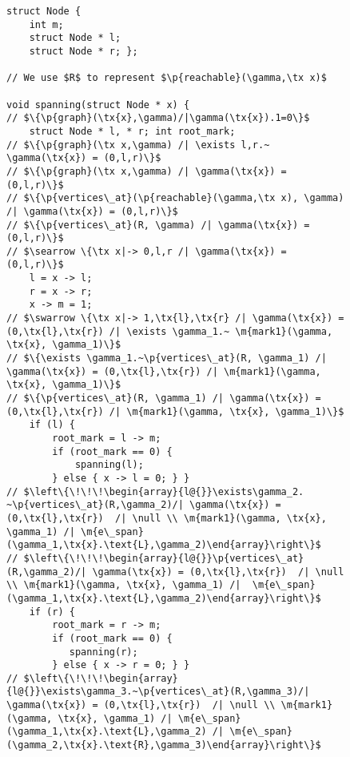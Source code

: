 \begin{figure}[t]
  \begin{lstlisting}
struct Node {
    int m;
    struct Node * l;
    struct Node * r; };

// We use $R$ to represent $\p{reachable}(\gamma,\tx x)$

void spanning(struct Node * x) { 
// $\{\p{graph}(\tx{x},\gamma)/|\gamma(\tx{x}).1=0\}$ 
    struct Node * l, * r; int root_mark;
// $\{\p{graph}(\tx x,\gamma) /| \exists l,r.~ \gamma(\tx{x}) = (0,l,r)\}$
// $\{\p{graph}(\tx x,\gamma) /| \gamma(\tx{x}) = (0,l,r)\}$
// $\{\p{vertices\_at}(\p{reachable}(\gamma,\tx x), \gamma) /| \gamma(\tx{x}) = (0,l,r)\}$
// $\{\p{vertices\_at}(R, \gamma) /| \gamma(\tx{x}) = (0,l,r)\}$
// $\searrow \{\tx x|-> 0,l,r /| \gamma(\tx{x}) = (0,l,r)\}$
    l = x -> l;
    r = x -> r;
    x -> m = 1;
// $\swarrow \{\tx x|-> 1,\tx{l},\tx{r} /| \gamma(\tx{x}) = (0,\tx{l},\tx{r}) /| \exists \gamma_1.~ \m{mark1}(\gamma, \tx{x}, \gamma_1)\}$
// $\{\exists \gamma_1.~\p{vertices\_at}(R, \gamma_1) /| \gamma(\tx{x}) = (0,\tx{l},\tx{r}) /| \m{mark1}(\gamma, \tx{x}, \gamma_1)\}$
// $\{\p{vertices\_at}(R, \gamma_1) /| \gamma(\tx{x}) = (0,\tx{l},\tx{r}) /| \m{mark1}(\gamma, \tx{x}, \gamma_1)\}$
    if (l) {
        root_mark = l -> m;
        if (root_mark == 0) {
            spanning(l);
        } else { x -> l = 0; } }
// $\left\{\!\!\!\begin{array}{l@{}}\exists\gamma_2. ~\p{vertices\_at}(R,\gamma_2)/| \gamma(\tx{x}) = (0,\tx{l},\tx{r})  /| \null \\ \m{mark1}(\gamma, \tx{x}, \gamma_1) /| \m{e\_span}(\gamma_1,\tx{x}.\text{L},\gamma_2)\end{array}\right\}$
// $\left\{\!\!\!\begin{array}{l@{}}\p{vertices\_at}(R,\gamma_2)/| \gamma(\tx{x}) = (0,\tx{l},\tx{r})  /| \null \\ \m{mark1}(\gamma, \tx{x}, \gamma_1) /|  \m{e\_span}(\gamma_1,\tx{x}.\text{L},\gamma_2)\end{array}\right\}$
    if (r) {
        root_mark = r -> m;
        if (root_mark == 0) {
           spanning(r);
        } else { x -> r = 0; } }
// $\left\{\!\!\!\begin{array}{l@{}}\exists\gamma_3.~\p{vertices\_at}(R,\gamma_3)/| \gamma(\tx{x}) = (0,\tx{l},\tx{r})  /| \null \\ \m{mark1}(\gamma, \tx{x}, \gamma_1) /| \m{e\_span}(\gamma_1,\tx{x}.\text{L},\gamma_2) /| \m{e\_span}(\gamma_2,\tx{x}.\text{R},\gamma_3)\end{array}\right\}$

\end{lstlisting}
\end{figure}
